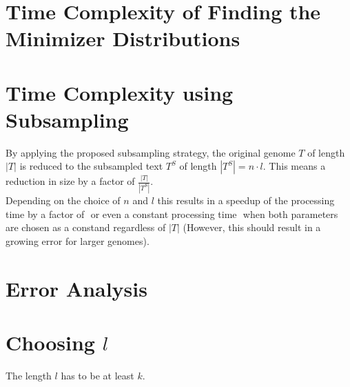 \documentclass[a4paper,titlepage,onecolumn,oneside,12pt,nenglish,titlepage=firstiscover]{scrbook}
\theoremstyle{plain} %
\theoremstyle{definition} %
\theoremstyle{remark} %
\theoremstyle{plain}
\newcommand{\numberOfSamples}{n}
\newcommand{\lengthOfSamples}{l}
\newcommand{\genomeText}{T}
\newcommand{\sampledText}{T^S}
\begin{document}
\section{Time Complexity of Finding the Minimizer Distributions}

\section{Time Complexity using Subsampling}
By applying the proposed subsampling strategy, the original genome $\genomeText$ of length $|\genomeText|$ is reduced to the subsampled text $\sampledText$ of length $|\sampledText| = \numberOfSamples \cdot \lengthOfSamples$. This means a reduction in size by a factor of $\frac{|\genomeText|}{|\sampledText|}$.\\
Depending on the choice of $\numberOfSamples$ and $\lengthOfSamples$ this results in a speedup of the processing time by a factor of $ $ or even a constant processing time $ $ when both parameters are chosen as a constand regardless of $|\genomeText|$ (However, this should result in a growing error for larger genomes).

\section{Error Analysis}

\section{Choosing $\lengthOfSamples$}
The length $\lengthOfSamples$ has to be at least $k$. 
\end{document}

